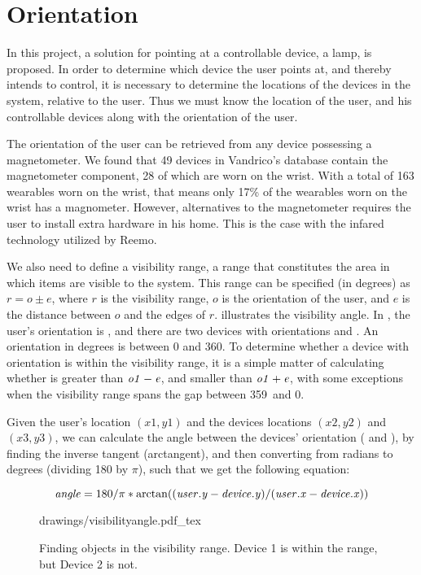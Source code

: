 \section{Orientation}\label{sec:analysis:orientation}
In this project, a solution for pointing at a controllable device, \eg a lamp, is proposed. 
In order to determine which device the user points at, 
and thereby intends to control, 
it is necessary to determine the locations of the devices in the system, 
relative to the user. 
Thus we must know the location of the user, 
and his controllable devices along with the orientation of the user.

The orientation of the user can be retrieved from any device possessing a magnetometer. 
We found that \num{49} devices in Vandrico's database contain the magnetometer component, 28 of which are worn on the wrist.
With a total of 163 wearables worn on the wrist, that means only 17\% of the wearables worn on the wrist has a magnometer. However, alternatives to the magnetometer requires the user to install extra hardware in his home. This is the case with the infared technology utilized by Reemo.

We also need to define a visibility range, 
\ie a range that constitutes the area in which items are visible to the system. 
This range can be specified (in degrees) as $r = o \pm e$, 
where $r$ is the visibility range, $o$ is the orientation of the user, 
and $e$ is the distance between $o$ and the edges of $r$.
 illustrates the visibility angle. 
In , the user's orientation is , 
and there are two devices with orientations  and . 
An orientation in degrees is between \num{0} and \num{360}. 
To determine whether a device with orientation  is within the visibility range, 
it is a simple matter of calculating whether  is greater than $\var{o1}-\var{e}$, 
and smaller than $\var{o1}+\var{e}$, 
with some exceptions when the visibility range spans the gap between 359\degree \ and 0\degree.

Given the user's location $(x1, y1)$ and the devices locations $(x2, y2)$ and $(x3, y3)$,
we can calculate the angle between the devices' orientation ( and ), 
by finding the inverse tangent (arctangent), 
and then converting from radians to degrees (dividing \num{180} by $\pi$), 
such that we get the following equation:

\begin{equation}\label{eq:angle}
\var{angle} = 180 / \pi * \arctan((\var{user.y} - \var{device.y}) / (\var{user.x} - \var{device.x}))
\end{equation}

\begin{figure}[!htb]
    \centering
    \def\svgwidth{0.6\textwidth}
    {drawings/visibilityangle.pdf_tex}
    \caption{Finding objects in the visibility range. Device 1 is within the range, but Device 2 is not.}
\label{fig:visibilityangle}
\end{figure}

